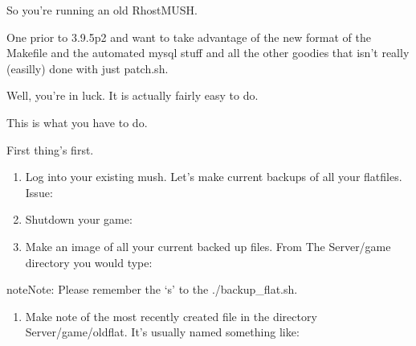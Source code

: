 \documentclass[letterpaper,10pt,english]{sphinxmanual}
\begin{document}
\sphinxAtStartPar
So you’re running an old RhostMUSH.

\sphinxAtStartPar
One prior to 3.9.5p2 and want to take advantage of the new
format of the Makefile and the automated mysql stuff and
all the other goodies that isn’t really (easilly) done
with just patch.sh.

\sphinxAtStartPar
Well, you’re in luck.  It is actually fairly easy to do.

\sphinxAtStartPar
This is what you have to do.

\sphinxAtStartPar
First thing’s first.
\begin{enumerate}
%
\item {} 
\sphinxAtStartPar
Log into your existing mush.  Let’s make current backups
of all your flatfiles.  Issue:

\begin{sphinxVerbatim}[commandchars=\\\{\}]
\end{sphinxVerbatim}

\item {} 
\sphinxAtStartPar
Shutdown your game:

\begin{sphinxVerbatim}[commandchars=\\\{\}]
\end{sphinxVerbatim}

\item {} 
\sphinxAtStartPar
Make an image of all your current backed up files.  From The Server/game directory you would type:

\begin{sphinxVerbatim}[commandchars=\\\{\}]
 
\end{sphinxVerbatim}

\end{enumerate}

\begin{sphinxadmonition}{note}{Note:}
\sphinxAtStartPar
Please remember the ‘\sphinxhyphen{}s’ to the ./backup\_flat.sh.
\end{sphinxadmonition}
\begin{enumerate}
%
\setcounter{enumi}{3}
\item {} 
\sphinxAtStartPar
Make note of the most recently created file in the directory Server/game/oldflat.  It’s usually named something like:

\begin{sphinxVerbatim}[commandchars=\\\{\}]
\end{sphinxVerbatim}

\end{enumerate}
\end{document}
